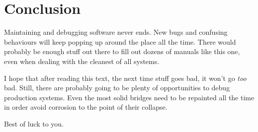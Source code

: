 \documentclass[11pt, oneside]{book}   	%
\begin{document}







\chapter*{Conclusion}


Maintaining and debugging software never ends. New bugs and confusing behaviours will keep popping up around the place all the time. There would probably be enough stuff out there to fill out dozens of manuals like this one, even when dealing with the cleanest of all systems. 

I hope that after reading this text, the next time stuff goes bad, it won't go \emph{too} bad. Still, there are probably going to be plenty of opportunities to debug production systems. Even the most solid bridges need to be repainted all the time in order avoid corrosion to the point of their collapse.

Best of luck to you.
\end{document}

